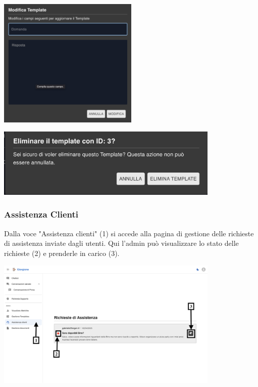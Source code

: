 \begin{center}
    \includegraphics[width=0.5\textwidth]{./img/ModificaTemplate.png}
    \label{fig:pop-up Modifica}
\end{center}

\hspace{0.05\textwidth}

\begin{center}
    \includegraphics[width=0.8\textwidth]{./img/EliminaTemplate.png}
    \label{fig:pop-up elimina}
\end{center}

\newpage

\subsubsection{Assistenza Clienti}
Dalla voce "Assistenza clienti" (1) si accede alla pagina di gestione delle richieste di assistenza inviate dagli utenti. Qui l'admin può visualizzare lo stato delle richieste (2) e prenderle in carico (3).
\begin{center}
    \includegraphics[width=0.8\textwidth]{./img/Assistenza1.png}
    \label{fig:Assistenza1}
\end{center}

